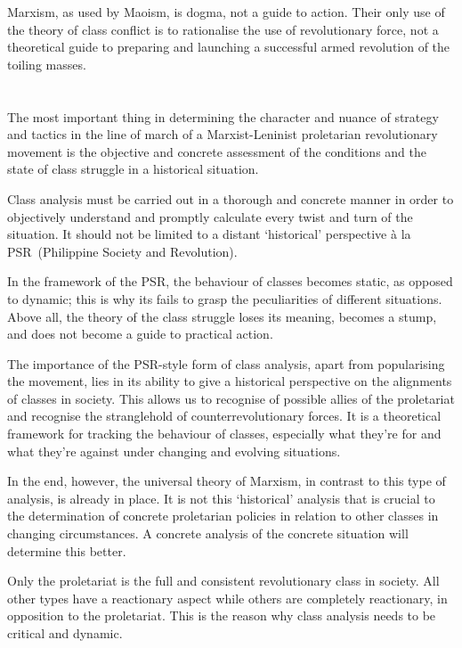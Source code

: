 Marxism, as used by Maoism, is dogma, not a guide to action. 
Their only use of the theory of class conflict is to rationalise 
the use of revolutionary force, 
not a theoretical guide to preparing 
and launching a successful armed revolution of the toiling masses.

\section{}
The most important thing in determining the character and nuance 
of strategy and tactics in the line of march of 
a Marxist-Leninist proletarian revolutionary movement 
is the objective and concrete assessment 
of the conditions and the state of class struggle in a historical situation.

Class analysis must be carried out in 
a thorough and concrete manner in order to 
objectively understand and promptly calculate 
every twist and turn of the situation. 
It should not be limited to a distant `historical' perspective 
à la PSR~(Philippine Society and Revolution).

In the framework of the PSR, 
the behaviour of classes becomes static,
as opposed to dynamic;
this is why its fails to grasp 
the peculiarities of different situations.
Above all, 
the theory of the class struggle 
loses its meaning,
becomes a stump, 
and does not become a guide to practical action.

The importance of the PSR-style form of class analysis, 
apart from popularising the movement, 
lies in its ability to give a 
historical perspective on the alignments of classes in society. 
This allows us to recognise of possible allies of the proletariat 
and recognise the stranglehold of counterrevolutionary forces. 
It is a theoretical framework 
for tracking the behaviour of classes, 
especially what they're for and what they're against 
under changing and evolving situations.

In the end, however, 
the universal theory of Marxism,
in contrast to this type of analysis, 
is already in place. 
It is not this `historical' analysis that is crucial 
to the determination of concrete proletarian policies 
in relation to other classes in changing circumstances. 
A concrete analysis of the concrete situation will determine this better.

Only the proletariat 
is the full and consistent revolutionary class in society. 
All other types have a reactionary aspect 
while others are completely reactionary,
in opposition to the proletariat. 
This is the reason why class analysis needs to be critical and dynamic.

